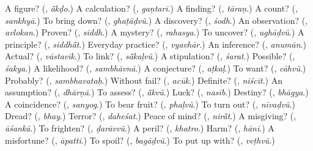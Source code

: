 \begin{tcolorbox}[breakable,colback=teal!4,colframe=teal!35!black,title={Before you move on}]
A figure? (\textbf{}, \emph{ā̃kḍo}.) A calculation? (\textbf{}, \emph{gaṇtarī}.) A finding? (\textbf{}, \emph{tāraṇ}.) A count? (\textbf{}, \emph{sankhyā}.) To bring down? (\textbf{}, \emph{ghaṭāḍvũ}.) A discovery? (\textbf{}, \emph{śodh}.) An observation? (\textbf{}, \emph{avlokan}.) Proven? (\textbf{}, \emph{siddh}.) A mystery? (\textbf{}, \emph{rahasya}.) To uncover? (\textbf{}, \emph{ughāḍvũ}.) A principle? (\textbf{}, \emph{siddhā̃t}.) Everyday practice? (\textbf{}, \emph{vyavhār}.) An inference? (\textbf{}, \emph{anumān}.) Actual? (\textbf{}, \emph{vāstavik}.) To link? (\textbf{}, \emph{sā̃kaḷvũ}.) A stipulation? (\textbf{}, \emph{śarat}.) Possible? (\textbf{}, \emph{śakya}.) A likelihood? (\textbf{}, \emph{sambhāvnā}.) A conjecture? (\textbf{}, \emph{aṭkaḷ}.) To want? (\textbf{}, \emph{cāhvũ}.) Probably? (\textbf{}, \emph{sambhavataḥ}.) Without fail? (\textbf{}, \emph{acūk}.) Definite? (\textbf{}, \emph{niścit}.) An assumption? (\textbf{}, \emph{dhārṇā}.) To assess? (\textbf{}, \emph{ā̃kvũ}.) Luck? (\textbf{}, \emph{nasīb}.) Destiny? (\textbf{}, \emph{bhāgya}.) A coincidence? (\textbf{}, \emph{sanyog}.) To bear fruit? (\textbf{}, \emph{phaḷvũ}.) To turn out? (\textbf{}, \emph{nīvaḍvũ}.) Dread? (\textbf{}, \emph{bhay}.) Terror? (\textbf{}, \emph{daheśat}.) Peace of mind? (\textbf{}, \emph{nirā̃t}.) A misgiving? (\textbf{}, \emph{āśankā}.) To frighten? (\textbf{}, \emph{ḍarāvvũ}.) A peril? (\textbf{}, \emph{khatro}.) Harm? (\textbf{}, \emph{hāni}.) A misfortune? (\textbf{}, \emph{āpatti}.) To spoil? (\textbf{}, \emph{bagāḍvũ}.) To put up with? (\textbf{}, \emph{veṭhvũ}.)
\end{tcolorbox}
